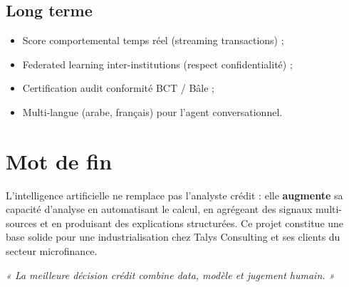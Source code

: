 \subsection{Long terme}

\begin{itemize}[leftmargin=*]
  \item Score comportemental temps réel (streaming transactions) ;
  \item Federated learning inter-institutions (respect confidentialité) ;
  \item Certification audit conformité BCT / Bâle ;
  \item Multi-langue (arabe, français) pour l'agent conversationnel.
\end{itemize}

\section{Mot de fin}

L'intelligence artificielle ne remplace pas l'analyste crédit : elle \textbf{augmente} sa capacité d'analyse en automatisant le calcul, en agrégeant des signaux multi-sources et en produisant des explications structurées. Ce projet constitue une base solide pour une industrialisation chez Talys Consulting et ses clients du secteur microfinance.

\vfill
\begin{center}
\textit{« La meilleure décision crédit combine data, modèle et jugement humain. »}
\end{center}
